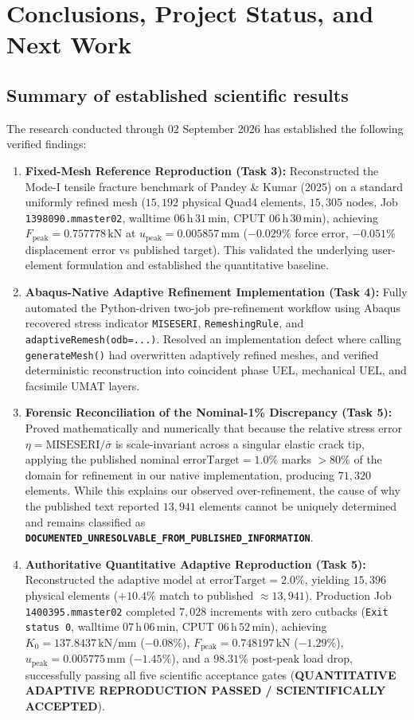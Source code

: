 \chapter{Conclusions, Project Status, and Next Work}
\label{ch:conclusions}

\section{Summary of established scientific results}
The research conducted through 02 September 2026 has established the following verified findings:
\begin{enumerate}
  \item \textbf{Fixed-Mesh Reference Reproduction (Task 3):} Reconstructed the Mode-I tensile fracture benchmark of Pandey \& Kumar (2025) on a standard uniformly refined mesh ($15{,}192$ physical Quad4 elements, $15{,}305$ nodes, Job \texttt{1398090.mmaster02}, walltime $06\,\mathrm{h}\,31\,\mathrm{min}$, CPUT $06\,\mathrm{h}\,30\,\mathrm{min}$), achieving $F_{\text{peak}} = 0.757778\,\mathrm{kN}$ at $u_{\text{peak}} = 0.005857\,\mathrm{mm}$ ($-0.029\%$ force error, $-0.051\%$ displacement error vs published target). This validated the underlying user-element formulation and established the quantitative baseline.
  \item \textbf{Abaqus-Native Adaptive Refinement Implementation (Task 4):} Fully automated the Python-driven two-job pre-refinement workflow using Abaqus recovered stress indicator \texttt{MISESERI}, \texttt{RemeshingRule}, and \texttt{adaptiveRemesh(odb=...)}. Resolved an implementation defect where calling \texttt{generateMesh()} had overwritten adaptively refined meshes, and verified deterministic reconstruction into coincident phase UEL, mechanical UEL, and facsimile UMAT layers.
  \item \textbf{Forensic Reconciliation of the Nominal-1\% Discrepancy (Task 5):} Proved mathematically and numerically that because the relative stress error $\eta = \text{MISESERI}/\bar{\sigma}$ is scale-invariant across a singular elastic crack tip, applying the published nominal $\text{errorTarget} = 1.0\%$ marks $>80\%$ of the domain for refinement in our native implementation, producing $71{,}320$ elements. While this explains our observed over-refinement, the cause of why the published text reported $13{,}941$ elements cannot be uniquely determined and remains classified as \textbf{\texttt{DOCUMENTED\_UNRESOLVABLE\_FROM\_PUBLISHED\_INFORMATION}}.
  \item \textbf{Authoritative Quantitative Adaptive Reproduction (Task 5):} Reconstructed the adaptive model at $\text{errorTarget} = 2.0\%$, yielding $15{,}396$ physical elements ($+10.4\%$ match to published $\approx 13{,}941$). Production Job \texttt{1400395.mmaster02} completed $7{,}028$ increments with zero cutbacks (\texttt{Exit status 0}, walltime $07\,\mathrm{h}\,06\,\mathrm{min}$, CPUT $06\,\mathrm{h}\,52\,\mathrm{min}$), achieving $K_0 = 137.8437\,\mathrm{kN/mm}$ ($-0.08\%$), $F_{\text{peak}} = 0.748197\,\mathrm{kN}$ ($-1.29\%$), $u_{\text{peak}} = 0.005775\,\mathrm{mm}$ ($-1.45\%$), and a $98.31\%$ post-peak load drop, successfully passing all five scientific acceptance gates (\textbf{QUANTITATIVE ADAPTIVE REPRODUCTION PASSED / SCIENTIFICALLY ACCEPTED}).

\end{enumerate}
